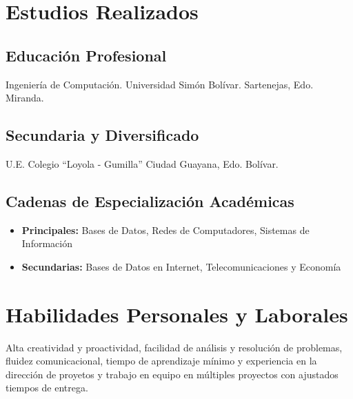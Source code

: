 \documentclass[letterpaper,11pt]{report}
\begin{document}
\section*{Estudios Realizados}
\subsection*{Educación Profesional}
Ingeniería de Computación. Universidad Simón Bolívar. Sartenejas, Edo. Miranda.
\subsection*{Secundaria y Diversificado}
U.E. Colegio ``Loyola - Gumilla''
Ciudad Guayana, Edo. Bolívar.
\subsection*{Cadenas de Especialización Académicas}
\begin{itemize}
\item
\textbf{Principales:} Bases de Datos, Redes de Computadores, Sistemas de Información
\item
\textbf{Secundarias:} Bases de Datos en Internet, Telecomunicaciones y Economía
\end{itemize}

\section*{Habilidades Personales y Laborales}
Alta creatividad y proactividad, facilidad de análisis y resolución de problemas, fluidez comunicacional, tiempo de aprendizaje mínimo y experiencia en la dirección de proyetos y trabajo en equipo en múltiples proyectos con ajustados tiempos de entrega.
\end{document}
